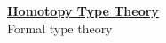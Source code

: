 \documentclass[hott-all.tex]{subfiles}
\begin{document}
\begin{center}
  {\Large{\underline{\textbf{Homotopy Type Theory}}}} \\[2mm]
  {\large Formal type theory}
\end{center}

\appendix
\renewcommand{\thechapter}{A}



%
%
%
\end{document}
